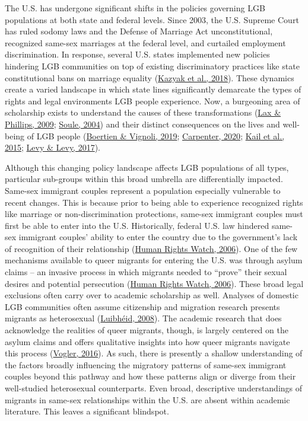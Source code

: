 \documentclass[
  11pt,
]{article}
\begin{document}
The U.S. has undergone significant shifts in the policies governing LGB populations at both state and federal levels. Since 2003, the U.S. Supreme Court has ruled sodomy laws and the Defense of Marriage Act unconstitutional, recognized same-sex marriages at the federal level, and curtailed employment discrimination. In response, several U.S. states implemented new policies hindering LGB communities on top of existing discriminatory practices like state constitutional bans on marriage equality (\protect\hyperlink{ref-kazyak_2018}{Kazyak et al., 2018}). These dynamics create a varied landscape in which state lines significantly demarcate the types of rights and legal environments LGB people experience. Now, a burgeoning area of scholarship exists to understand the causes of these transformations (\protect\hyperlink{ref-lax_2009}{Lax \& Phillips, 2009}; \protect\hyperlink{ref-soule_2004}{Soule, 2004}) and their distinct consequences on the lives and well-being of LGB people (\protect\hyperlink{ref-boertien_2019}{Boertien \& Vignoli, 2019}; \protect\hyperlink{ref-carpenter_2020}{Carpenter, 2020}; \protect\hyperlink{ref-kail_2015}{Kail et al., 2015}; \protect\hyperlink{ref-levy_2017}{Levy \& Levy, 2017}).

Although this changing policy landscape affects LGB populations of all types, particular sub-groups within this broad umbrella are differentially impacted. Same-sex immigrant couples represent a population especially vulnerable to recent changes. This is because prior to being able to experience recognized rights like marriage or non-discrimination protections, same-sex immigrant couples must first be able to enter into the U.S. Historically, federal U.S. law hindered same-sex immigrant couples' ability to enter the country due to the government's lack of recognition of their relationship (\protect\hyperlink{ref-humanrightswatch_2006}{Human Rights Watch, 2006}). One of the few mechanisms available to queer migrants for entering the U.S. was through asylum claims -- an invasive process in which migrants needed to ``prove'' their sexual desires and potential persecution (\protect\hyperlink{ref-humanrightswatch_2006}{Human Rights Watch, 2006}). These broad legal exclusions often carry over to academic scholarship as well. Analyses of domestic LGB communities often assume citizenship and migration research presents migrants as heterosexual (\protect\hyperlink{ref-luibheid_2008}{Luibhéid, 2008}). The academic research that does acknowledge the realities of queer migrants, though, is largely centered on the asylum claims and offers qualitative insights into how queer migrants navigate this process (\protect\hyperlink{ref-vogler_2016}{Vogler, 2016}). As such, there is presently a shallow understanding of the factors broadly influencing the migratory patterns of same-sex immigrant couples beyond this pathway and how these patterns align or diverge from their well-studied heterosexual counterparts. Even broad, descriptive understandings of migrants in same-sex relationships within the U.S. are absent within academic literature. This leaves a significant blindspot.
\end{document}
